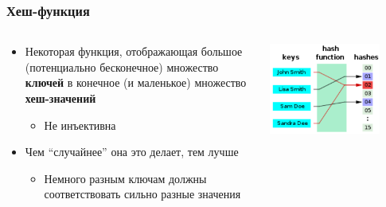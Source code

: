 \documentclass[xetex,mathserif,serif]{beamer}
\begin{document}
	\begin{frame}
		\frametitle{Хеш-функция}
		\begin{columns}
			\begin{column}{0.6\textwidth}
				\begin{itemize}
					\item Некоторая функция, отображающая большое (потенциально бесконечное) множество \textbf{ключей} в конечное (и маленькое) множество \textbf{хеш-значений}
					\begin{itemize}
						\item Не инъективна
					\end{itemize}
					\item Чем ``случайнее'' она это делает, тем лучше
					\begin{itemize}
						\item Немного разным ключам должны соответствовать сильно разные значения
					\end{itemize}
				\end{itemize}
			\end{column}
			\begin{column}{0.4\textwidth}
				\begin{center}
					\includegraphics[width=0.8\textwidth]{hashFunction.png}
				\end{center}
			\end{column}
		\end{columns}
	\end{frame}
\end{document}
